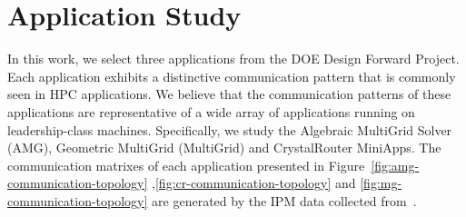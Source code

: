 
\section{Application Study}
\label{sec:application study}

In this work, we select three applications from the DOE Design Forward Project. 
Each application exhibits a distinctive communication pattern that is commonly seen in HPC applications. 
We believe that the communication patterns of these applications 
are representative of a wide array of applications running on leadership-class machines. 
Specifically, we study the Algebraic MultiGrid Solver (AMG), 
Geometric MultiGrid (MultiGrid) and CrystalRouter MiniApps. 
The communication matrixes of each application presented in Figure~\ref{fig:amg-communication-topology}
,\ref{fig:cr-communication-topology} and \ref{fig:mg-communication-topology} are generated by
the IPM data collected from~\cite{designforwardwebpage}.




